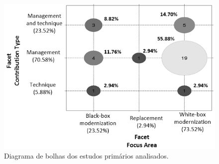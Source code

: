 %
%
\begin{figure}
\centering
\includegraphics[scale=0.8]{img/mapeamento/bubble_diagram.png}
%
\caption{Diagrama de bolhas dos estudos primários analisados.}
\label{fig:buble_diagram}
\end{figure}



\vspace{0.2cm} 
